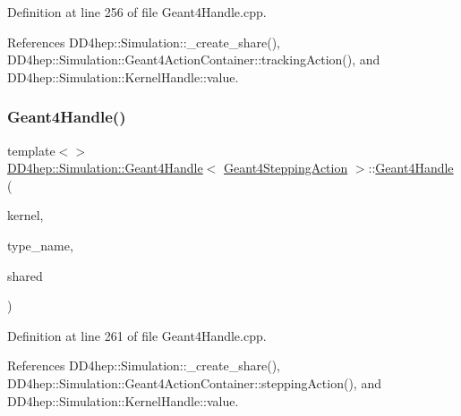 Definition at line 256 of file Geant4\+Handle.\+cpp.



References D\+D4hep\+::\+Simulation\+::\+\_\+create\+\_\+share(), D\+D4hep\+::\+Simulation\+::\+Geant4\+Action\+Container\+::tracking\+Action(), and D\+D4hep\+::\+Simulation\+::\+Kernel\+Handle\+::value.

\hypertarget{class_d_d4hep_1_1_simulation_1_1_geant4_handle_ad42d43ea2a060ed1a484a5e65e201e53}{}\label{class_d_d4hep_1_1_simulation_1_1_geant4_handle_ad42d43ea2a060ed1a484a5e65e201e53} 
\subsubsection{\texorpdfstring{Geant4\+Handle()}{Geant4Handle()}\hspace{0.1cm}{\footnotesize\ttfamily [16/20]}}
{\footnotesize\ttfamily template$<$$>$ \\
\hyperlink{class_d_d4hep_1_1_simulation_1_1_geant4_handle}{D\+D4hep\+::\+Simulation\+::\+Geant4\+Handle}$<$ \hyperlink{class_d_d4hep_1_1_simulation_1_1_geant4_stepping_action}{Geant4\+Stepping\+Action} $>$\+::\hyperlink{class_d_d4hep_1_1_simulation_1_1_geant4_handle}{Geant4\+Handle} (\begin{DoxyParamCaption}\item[{\hyperlink{class_d_d4hep_1_1_simulation_1_1_geant4_kernel}{Geant4\+Kernel} \&}]{kernel,  }\item[{const string \&}]{type\+\_\+name,  }\item[{bool}]{shared }\end{DoxyParamCaption})}



Definition at line 261 of file Geant4\+Handle.\+cpp.



References D\+D4hep\+::\+Simulation\+::\+\_\+create\+\_\+share(), D\+D4hep\+::\+Simulation\+::\+Geant4\+Action\+Container\+::stepping\+Action(), and D\+D4hep\+::\+Simulation\+::\+Kernel\+Handle\+::value.

\hypertarget{class_d_d4hep_1_1_simulation_1_1_geant4_handle_af736cadbc360dc972f86c39321a03ef7}{}\label{class_d_d4hep_1_1_simulation_1_1_geant4_handle_af736cadbc360dc972f86c39321a03ef7} 
